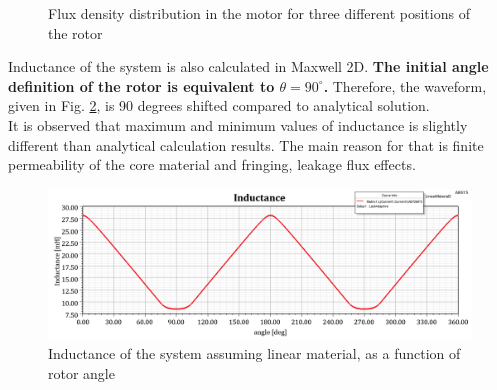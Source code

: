 \documentclass{reportClass}
\begin{document}
\begin{figure}[h!]
    \centering
       \hspace{0.5cm}
         \hspace{0.5cm}
  \caption{Flux density distribution in the motor for three different positions of the rotor}
  \label{fig:bvec_lin} 
\end{figure}

Inductance of the system is also calculated in Maxwell 2D. \textbf{The initial angle definition of the rotor is equivalent to $\theta = 90^\circ$.} Therefore, the waveform, given in Fig. \ref{fig:ind_lin}, is 90 degrees shifted compared to analytical solution.\\

It is observed that maximum and minimum values of inductance is slightly different than analytical calculation results. The main reason for that is finite permeability of the core material and fringing, leakage flux effects.

\begin{figure}[h!]
    \centering
\includegraphics[width=0.75\linewidth]{ind_lin_wrtangle.png}
\caption{Inductance of the system assuming linear material, as a function of rotor angle}
  \label{fig:ind_lin} 
\end{figure}
\end{document}

